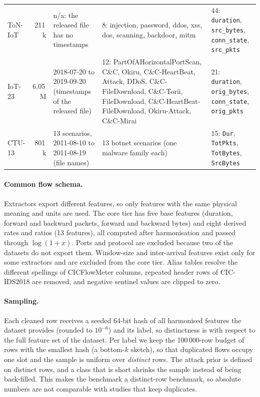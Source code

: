 \documentclass[pdflatex,sn-mathphys-num]{sn-jnl}%
\begin{document}
\begin{table}[htbp]
{\begin{tabular}{p{}rp{}p{}p{}}
ToN-IoT & 211\,k & n/a: the released file has no timestamps & 8: injection, password, ddos, xss, dos, scanning, backdoor, mitm & 44: \texttt{duration}, \texttt{src\_bytes}, \texttt{conn\_state}, \texttt{src\_pkts} \\
IoT-23 & 6.05\,M & 2018-07-20 to 2019-09-20 (timestamps of the released file) & 12: PartOfAHorizontalPortScan, C\&C, Okiru, C\&C-HeartBeat, Attack, DDoS, C\&C-FileDownload, C\&C-Torii, FileDownload, C\&C-HeartBeat-FileDownload, Okiru-Attack, C\&C-Mirai & 21: \texttt{duration}, \texttt{orig\_bytes}, \texttt{conn\_state}, \texttt{orig\_pkts} \\
CTU-13 & 801\,k & 13 scenarios, 2011-08-10 to 2011-08-19 (file names) & 13 botnet scenarios (one malware family each) & 15: \texttt{Dur}, \texttt{TotPkts}, \texttt{TotBytes}, \texttt{SrcBytes} \\
\bottomrule
\end{tabular}}
\end{table}

\paragraph{Common flow schema.}
Extractors export different features, so only features with the same physical meaning and units are used.
The core tier has five base features (duration, forward and backward packets, forward and backward bytes) and eight derived rates and ratios (13 features), all computed after harmonisation and passed through $\log(1+x)$.
Ports and protocol are excluded because two of the datasets do not export them.
Window-size and inter-arrival features exist only for some extractors and are excluded from the core tier.
Alias tables resolve the different spellings of CICFlowMeter columns, repeated header rows of CIC-IDS2018 are removed, and negative sentinel values are clipped to zero.

\paragraph{Sampling.}
Each cleaned row receives a seeded 64-bit hash of all harmonised features the dataset provides (rounded to $10^{-6}$) and its label, so distinctness is with respect to the full feature set of the dataset.
Per label we keep the 100\,000-row budget of rows with the smallest hash (a bottom-$k$ sketch), so that duplicated flows occupy one slot and the sample is uniform over \emph{distinct} rows.
The attack prior is defined on distinct rows, and a class that is short shrinks the sample instead of being back-filled.
This makes the benchmark a distinct-row benchmark, so absolute numbers are not comparable with studies that keep duplicates.
\end{document}
